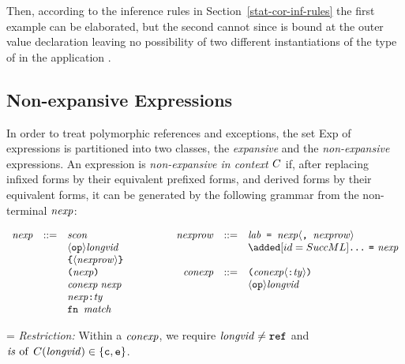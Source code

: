 Then, according to the 
inference rules in Section~\ref{stat-cor-inf-rules}
the first example can be elaborated, but the second cannot since 
is bound at the outer value declaration leaving no possibility of two 
different instantiations of the type of  in the application
.


\subsection{Non-expansive Expressions}
\label{expansive-sec}
In order to treat polymorphic references and exceptions,
the set Exp of expressions is partitioned into two classes, the {\sl
expansive} and the {\sl non-expansive} expressions. 
An expression
     is {\sl non-expansive in context $C$} if, after replacing infixed forms 
     by their equivalent prefixed forms, and derived forms by their equivalent
     forms, it can be generated  by the following grammar from the 
     non-terminal ${\it nexp}$:
\medskip

\begin{displaymath}
  \begin{array}{rcl@{\hskip18mm}rcl}
    \nexp & ::= & \scon & \nexprow & ::= & \boxml{$\lab$ = $\nexp\langle$, $\nexprow\rangle$} \\
    & & \langle\OP\rangle\longvid & & & \ADD{\boxml{...}\ \boxml{=}\ \nexp} \\
    & & \ttlbrace\langle\nexprow\rangle\ttrbrace \\
    & &\boxml{($\nexp$)} & \conexp & ::= & \boxml{($\conexp\langle$:$\ty\rangle$)} \\
    & &\boxml{$\conexp\;\nexp$} & & & \hbox{$\langle\OP\rangle\longvid$} \\
    & &\nexp \boxml{:} \ty \\
    & &\boxml{fn $\match$}
  \end{array}%
\end{displaymath}%


\hangindent=\parindent{}\noindent
{\sl Restriction:}\/ Within a ${\it conexp}$, we require ${\it longvid}\neq\mbox{\tt ref}$ and
$\hbox{\it is}\, \mathbin{\rm of} \,C({\it longvid})\in\{\hbox{\tt c},\hbox{\tt e}\}$.\medskip

